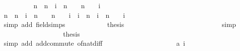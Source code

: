 \begin{isabellebody}
\ \ \ \ \ \ \ \ \isamarkupfalse%
\ {\isachardoublequoteopen}{\isacharparenleft}{\isacharquery}n\ {\isacharslash}\ {\isacharparenleft}{\isacharquery}n\ {\isacharminus}\ {\isacharquery}i{\isacharparenright}\ {\isacharminus}\ {\isacharparenleft}{\isacharquery}n\ {\isacharplus}\ {}{\isacharparenright}\ {\isacharslash}\ {\isacharparenleft}{\isacharquery}n\ {\isacharplus}\ {}\ {\isacharminus}\ {\isacharquery}i{\isacharparenright}{\isacharparenright}\ {\isachargreater}\ {}{\isachardoublequoteclose}\isanewline
\ \ \ \ \ \ \ \ \isamarkupfalse%
{\isacharminus}\isanewline
\ \ \ \ \ \ \ \ \ \ \isamarkupfalse%
\ {\isachardoublequoteopen}{\isacharquery}n\ {\isacharslash}\ {\isacharparenleft}{\isacharquery}n\ {\isacharminus}\ {\isacharquery}i{\isacharparenright}\ {\isacharminus}\ {\isacharparenleft}{\isacharquery}n\ {\isacharplus}\ {}{\isacharparenright}\ {\isacharslash}\ {\isacharparenleft}{\isacharquery}n\ {\isacharplus}\ {}\ {\isacharminus}\ {\isacharquery}i{\isacharparenright}\ {\isacharequal}\ {\isacharquery}i\ {\isacharslash}\ {\isacharparenleft}{\isacharparenleft}{\isacharquery}n\ {\isacharminus}\ {\isacharquery}i{\isacharparenright}\ {\isacharasterisk}\ {\isacharparenleft}{\isacharquery}n\ {\isacharplus}\ {}\ {\isacharminus}\ {\isacharquery}i{\isacharparenright}{\isacharparenright}{\isachardoublequoteclose}\isanewline
\ \ \ \ \ \ \ \ \ \ \ \ \isamarkupfalse%
\ {\isacharasterisk}\isanewline
\ \ \ \ \ \ \ \ \ \ \ \ \isamarkupfalse%
\ {\isacharparenleft}simp\ add{\isacharcolon}\ field{\isacharunderscore}simps{\isacharparenright}\isanewline
\ \ \ \ \ \ \ \ \ \ \isamarkupfalse%
\ {\isacharquery}thesis\isanewline
\ \ \ \ \ \ \ \ \ \ \ \ \isamarkupfalse%
\ {\isacharasterisk}\isanewline
\ \ \ \ \ \ \ \ \ \ \ \ \isamarkupfalse%
\ simp\isanewline
\ \ \ \ \ \ \ \ \isamarkupfalse%
\isanewline
\ \ \ \ \ \ \ \ \isamarkupfalse%
\ {\isacharquery}thesis\isanewline
\ \ \ \ \ \ \ \ \ \ \isamarkupfalse%
\ {\isacharasterisk}\isanewline
\ \ \ \ \ \ \ \ \ \ \isamarkupfalse%
\ {\isacharparenleft}simp\ add{\isacharcolon}\ add{\isachardot}commute\ of{\isacharunderscore}nat{\isacharunderscore}diff{\isacharparenright}\isanewline
\ \ \ \ \ \ \isamarkupfalse%
\isanewline
\ \ \ \ \ \ \isamarkupfalse%
\isanewline
\ \ \ \ \ \ \isamarkupfalse%
\ {\isachardoublequoteopen}a\ i\ {\isachargreater}\ {}{\isachardoublequoteclose}\isanewline

\end{isabellebody}
